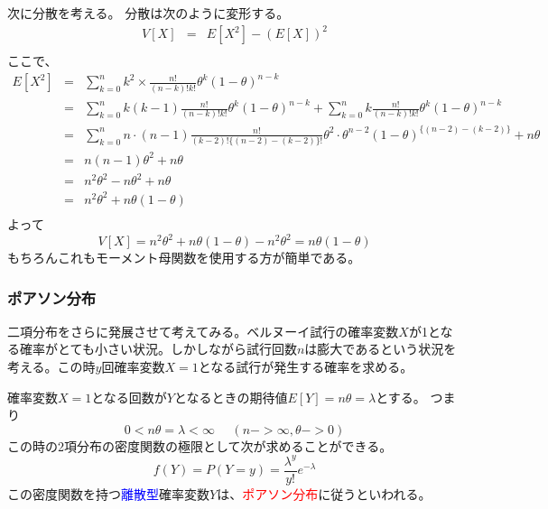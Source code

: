 \documentclass[a4paper,10pt]{jarticle}
\begin{document}
次に分散を考える。
分散は次のように変形する。
\begin{eqnarray*}
    V[X]&=&E[X^2]-(E[X])^2\\
\end{eqnarray*}
ここで、
\begin{eqnarray*}
    E[X^2] &=& \sum_{k=0}^n k^2\times \frac{n!}{(n-k)!k!}\theta^k (1-\theta)^{n-k}\\
    &=& \sum_{k=0}^n k(k-1)\frac{n!}{(n-k)!k!}\theta^k (1-\theta)^{n-k}+\sum_{k=0}^n k\frac{n!}{(n-k)!k!}\theta^k (1-\theta)^{n-k}\\
    &=& \sum_{k=0}^n n\cdot(n-1)\frac{n!}{(k-2)!\{(n-2)-(k-2)\}!}\theta^2\cdot \theta^{n-2}(1-\theta)^{\{(n-2)-(k-2)\}}+n\theta\\
    &=& n(n-1)\theta^2+n\theta\\
    &=& n^2\theta^2-n\theta^2+n\theta\\
    &=& n^2\theta^2+n\theta(1-\theta)\\
\end{eqnarray*}
よって
\begin{equation}
    V[X] = n^2\theta^2+n\theta(1-\theta)-n^2\theta^2 = n\theta(1-\theta)\tag{3,9}
\end{equation}
もちろんこれもモーメント母関数を使用する方が簡単である。
\subsubsection{ポアソン分布}
二項分布をさらに発展させて考えてみる。ベルヌーイ試行の確率変数$X$が1となる確率がとても小さい状況。しかしながら試行回数$n$は膨大であるという状況を考える。この時$y$回確率変数$X=1$となる試行が発生する確率を求める。

確率変数$X=1$となる回数が$Y$となるときの期待値$E[Y] = n\theta = \lambda$とする。
つまり
\begin{equation}
    0<n\theta = \lambda < \infty \ \ \ \ \ \ (n->\infty,\theta->0)\tag{3,4}
\end{equation}
この時の2項分布の密度関数の極限として次が求めることができる。
\begin{equation}
    f(Y) = P(Y = y)=\frac{\lambda^y}{y!}e^{-\lambda}\tag{3,10}
\end{equation}
この密度関数を持つ\textcolor{blue}{離散型}確率変数$Y$は、\textcolor{red}{ポアソン分布}に従うといわれる。
\end{document}
